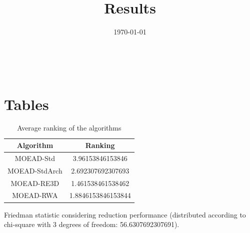 \documentclass{article}
\title{Results}
\author{}
\date{\today}
\begin{document}
\oddsidemargin 0in \topmargin 0in\maketitle
\
\section{Tables}
\begin{table}[!htp]
\centering
\caption{Average ranking of the algorithms}
\begin{tabular}{c|c}
Algorithm&Ranking\\
\hline
MOEAD-Std&3.96153846153846\\
MOEAD-StdArch&2.692307692307693\\
MOEAD-RE3D&1.461538461538462\\
MOEAD-RWA&1.8846153846153844\\
\end{tabular}
\end{table}


Friedman statistic considering reduction performance (distributed according to chi-square with 3 degrees of freedom: 56.6307692307691).
\end{document}
